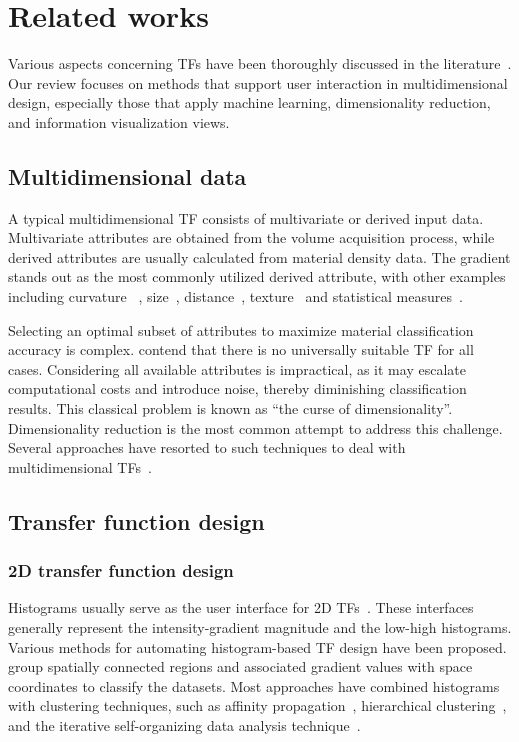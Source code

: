 \section{Related works}
\label{sect:related-works}
Various aspects concerning TFs have been thoroughly discussed in the literature~\cite{ljung2016}. Our review focuses on methods that support user interaction in multidimensional design, especially those that apply machine learning, dimensionality reduction, and information visualization views.

\subsection{Multidimensional data}
\label{subsect:multidimensional-data}

A typical multidimensional TF consists of multivariate or derived input data. Multivariate attributes are obtained from the volume acquisition process, while derived attributes are usually calculated from material density data. The gradient stands out as the most commonly utilized derived attribute, with other examples including curvature ~\cite{hladuvka2000, kindlmann2003}, size~\cite{correa2008, wesarg2009}, distance~\cite{tappenbeck2006}, texture~\cite{caban2008} and statistical measures~\cite{haidacher2010}. 

Selecting an optimal subset of attributes to maximize material classification accuracy is complex. \cite{arens2010} contend that there is no universally suitable TF for all cases. Considering all available attributes is impractical, as it may escalate computational costs and introduce noise, thereby diminishing classification results. This classical problem is known as  ``the curse of dimensionality''. Dimensionality reduction is the most common attempt to address this challenge. Several approaches have resorted to such techniques to deal with multidimensional TFs~\cite{cai2017, abbasloo2016, gao2022, moura2007, zhao2010}.

\subsection{Transfer function design}
\label{subsect:transfer-function-design}

\subsubsection{2D transfer function design}
Histograms usually serve as the user interface for 2D TFs~\cite{kniss2002}. These interfaces generally represent the intensity-gradient magnitude and the low-high histograms. Various methods for automating histogram-based TF design have been proposed. \cite{roettger2005} group spatially connected regions and associated gradient values with space coordinates to classify the datasets. Most approaches have combined histograms with clustering techniques, such as affinity propagation~\cite{zhang2016}, hierarchical clustering~\cite{sereda2006}, and the iterative self-organizing data analysis technique~\cite{tzeng2004}. 

